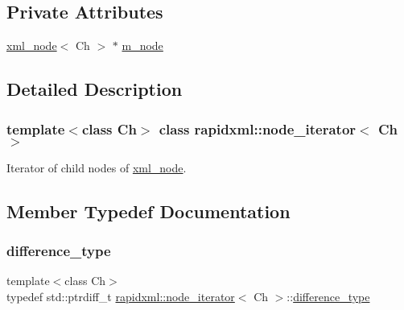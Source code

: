 \subsection*{Private Attributes}
\begin{DoxyCompactItemize}
\item 
\mbox{\hyperlink{classrapidxml_1_1xml__node}{xml\+\_\+node}}$<$ Ch $>$ $\ast$ \mbox{\hyperlink{classrapidxml_1_1node__iterator_adeb3cd87d8ea08aa56d14166146fa291}{m\+\_\+node}}
\end{DoxyCompactItemize}


\subsection{Detailed Description}
\subsubsection*{template$<$class Ch$>$\newline
class rapidxml\+::node\+\_\+iterator$<$ Ch $>$}

Iterator of child nodes of \mbox{\hyperlink{classrapidxml_1_1xml__node}{xml\+\_\+node}}. 

\subsection{Member Typedef Documentation}
\mbox{\label{classrapidxml_1_1node__iterator_a5bdc462b980a52c5fa2d99ac9f4f4bff}} 
\subsubsection{\texorpdfstring{difference\_type}{difference\_type}}
{\footnotesize\ttfamily template$<$class Ch$>$ \\
typedef std\+::ptrdiff\+\_\+t \mbox{\hyperlink{classrapidxml_1_1node__iterator}{rapidxml\+::node\+\_\+iterator}}$<$ Ch $>$\+::\mbox{\hyperlink{classrapidxml_1_1node__iterator_a5bdc462b980a52c5fa2d99ac9f4f4bff}{difference\+\_\+type}}}

\mbox{\label{classrapidxml_1_1node__iterator_a8e82d75f768e17bf7349d010ee26c037}} 
